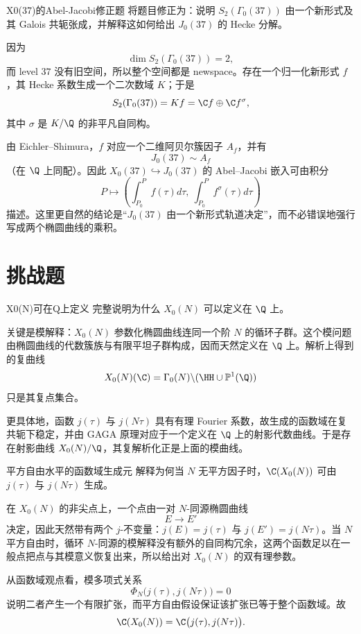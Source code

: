 \begin{problem}{X0(37)的Abel-Jacobi修正题}
将题目修正为：说明 $S_2(\Gamma_0(37))$ 由一个新形式及其 Galois 共轭张成，并解释这如何给出 $J_0(37)$ 的 Hecke 分解。
\end{problem}
\begin{solution}
因为
\[
\dim S_2(\Gamma_0(37))=2,
\]
而 level $37$ 没有旧空间，所以整个空间都是 newspace。存在一个归一化新形式 $f$，其 Hecke 系数生成一个二次数域 $K$；于是
\[
S_2(\Gamma_0(37))=Kf=\C f\oplus\C f^\sigma,
\]
其中 $\sigma$ 是 $K/\Q$ 的非平凡自同构。

由 Eichler--Shimura，$f$ 对应一个二维阿贝尔簇因子 $A_f$，并有
\[
J_0(37)\sim A_f
\]
（在 $\Q$ 上同配）。因此 $X_0(37)\hookrightarrow J_0(37)$ 的 Abel--Jacobi 嵌入可由积分
\[
P\longmapsto \left(\int_{P_0}^P f(\tau)d\tau,\ \int_{P_0}^P f^\sigma(\tau)d\tau\right)
\]
描述。这里更自然的结论是“$J_0(37)$ 由一个新形式轨道决定”，而不必错误地强行写成两个椭圆曲线的乘积。
\end{solution}

\section{挑战题 \hard}

\begin{problem}{X0(N)可在Q上定义}
完整说明为什么 $X_0(N)$ 可以定义在 $\Q$ 上。
\end{problem}
\begin{solution}
关键是模解释：$X_0(N)$ 参数化椭圆曲线连同一个阶 $N$ 的循环子群。这个模问题由椭圆曲线的代数簇族与有限平坦子群构成，因而天然定义在 $\Q$ 上。解析上得到的复曲线
\[
X_0(N)(\C)=\Gamma_0(N)\backslash(\HH\cup\mathbb{P}^1(\Q))
\]
只是其复点集合。

更具体地，函数 $j(\tau)$ 与 $j(N\tau)$ 具有有理 Fourier 系数，故生成的函数域在复共轭下稳定，并由 GAGA 原理对应于一个定义在 $\Q$ 上的射影代数曲线。于是存在射影曲线 $X_0(N)/\Q$，其复解析化正是上面的模曲线。
\end{solution}

\begin{problem}{平方自由水平的函数域生成元}
解释为何当 $N$ 无平方因子时，$\C(X_0(N))$ 可由 $j(\tau)$ 与 $j(N\tau)$ 生成。
\end{problem}
\begin{solution}
在 $X_0(N)$ 的非尖点上，一个点由一对 $N$-同源椭圆曲线
\[
E\to E'
\]
决定，因此天然带有两个 $j$-不变量：$j(E)=j(\tau)$ 与 $j(E')=j(N\tau)$。当 $N$ 平方自由时，循环 $N$-同源的模解释没有额外的自同构冗余，这两个函数足以在一般点把点与其模意义恢复出来，所以给出对 $X_0(N)$ 的双有理参数。

从函数域观点看，模多项式关系
\[
\Phi_N\bigl(j(\tau),j(N\tau)\bigr)=0
\]
说明二者产生一个有限扩张，而平方自由假设保证该扩张已等于整个函数域。故
\[
\C(X_0(N))=\C\bigl(j(\tau),j(N\tau)\bigr).
\]
\end{solution}

